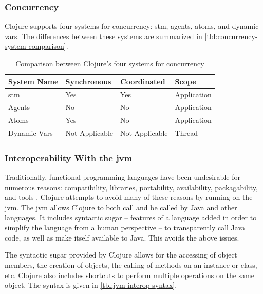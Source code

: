 		\subsubsection{Concurrency}
			Clojure supports four systems for concurrency:  \gls{stm}, agents, atoms, and dynamic vars.  The differences between these systems are summarized in \vref{tbl:concurrency-system-comparison}.
			
			\begin{table}
				\centering
				
				\begin{tabular}{llll}
					\toprule
					System Name & Synchronous & Coordinated & Scope \\
					\midrule
					\gls{stm} & Yes & Yes & Application \\
					Agents & No & No & Application \\
					Atoms & Yes & No & Application \\
					Dynamic Vars & Not Applicable & Not Applicable & Thread \\
					\bottomrule
				\end{tabular}
				
				\caption{Comparison between Clojure's four systems for concurrency}
				\label{tbl:concurrency-system-comparison}
			\end{table}
			
			
		\subsubsection{Interoperability With the \gls{jvm}}
			Traditionally, functional programming languages have been undesirable for numerous reasons:  compatibility, libraries, portability, availability, packagability, and tools \cite{no-fp-98}.  Clojure attempts to avoid many of these reasons by running on the \gls{jvm}.  The \gls{jvm} allows Clojure to both call and be called by Java and other languages.  It includes syntactic sugar -- features of a language added in order to simplify the language from a human perspective -- to transparently call Java code, as well as make itself available to Java.  This avoids the above issues.
			
			The syntactic sugar provided by Clojure allows for the accessing of object members, the creation of objects, the calling of methods on an instance or class, etc.  Clojure also includes shortcuts to perform multiple operations on the same object.  The syntax is given in \vref{tbl:jvm-interop-syntax}.
			
